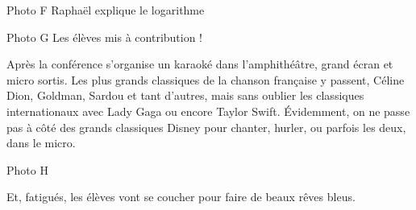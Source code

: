 Photo F
Raphaël explique le logarithme

Photo G
Les élèves mis à contribution !

Après la conférence s’organise un karaoké dans l’amphithéâtre, grand écran et micro sortis. Les plus grands classiques de la chanson française y passent, Céline Dion, Goldman, Sardou et tant d’autres, mais sans oublier les classiques internationaux avec Lady Gaga ou encore Taylor Swift. Évidemment, on ne passe pas à côté des grands classiques Disney pour chanter, hurler, ou parfois les deux, dans le micro.

Photo H

Et, fatigués, les élèves vont se coucher pour faire de beaux rêves bleus.

